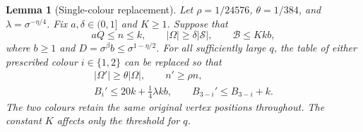 \documentclass[11pt]{article}
\newtheorem{lemma}[theorem]{Lemma}
\theoremstyle{definition}
\theoremstyle{remark}
\newcommand{\BB}{\mathcal B}
\newcommand{\SSS}{\mathscr S}
\begin{document}
\begin{lemma}[Single-colour replacement]\label{lem:rewrite}
Let $\rho=1/24576$, $\theta=1/384$, and
$\lambda=\sigma^{-\eta/4}$. Fix $a,\delta\in(0,1]$ and $K\ge1$.
Suppose that
\[
 aQ\le n\le k,\qquad |\Omega|\ge\delta|\SSS|,\qquad
 \BB\le Kkb,
\]
where $b\ge1$ and $D=\sigma^\beta b\le\sigma^{1-\eta/2}$.
For all sufficiently large $q$, the table of either prescribed colour
$i\in\{1,2\}$ can be replaced so that
\begin{equation}\label{eq:rewrite}
 \begin{gathered}
 |\Omega'|\ge\theta|\Omega|,\qquad n'\ge\rho n,\\
 B_i'\le20k+\tfrac14\lambda kb,\qquad
 B_{3-i}'\le B_{3-i}+k.
 \end{gathered}
\end{equation}
The two colours retain the same original vertex positions throughout.
The constant $K$ affects only the threshold for $q$.
\end{lemma}
\end{document}
